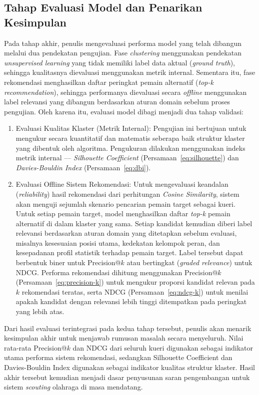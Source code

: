 \subsection{Tahap Evaluasi Model dan Penarikan Kesimpulan}
\label{subsec:evaluasi}

Pada tahap akhir, penulis mengevaluasi performa model yang telah dibangun melalui dua pendekatan pengujian. Fase \emph{clustering} menggunakan pendekatan \emph{unsupervised learning} yang tidak memiliki label data aktual (\emph{ground truth}), sehingga kualitasnya dievaluasi menggunakan metrik internal. Sementara itu, fase rekomendasi menghasilkan daftar peringkat pemain alternatif (\emph{top-k recommendation}), sehingga performanya dievaluasi secara \emph{offline} menggunakan label relevansi yang dibangun berdasarkan aturan domain sebelum proses pengujian. Oleh karena itu, evaluasi model dibagi menjadi dua tahap validasi:

\begin{enumerate}
  \item Evaluasi Kualitas Klaster (Metrik Internal): Pengujian ini bertujuan untuk mengukur secara kuantitatif dan matematis seberapa baik struktur klaster yang dibentuk oleh algoritma. Pengukuran dilakukan menggunakan indeks metrik internal --- \emph{Silhouette Coefficient} (Persamaan~\eqref{eq:silhouette}) dan \emph{Davies-Bouldin Index} (Persamaan~\eqref{eq:dbi}).

  \item Evaluasi Offline Sistem Rekomendasi: Untuk mengevaluasi keandalan (\emph{reliability}) hasil rekomendasi dari perhitungan \emph{Cosine Similarity}, sistem akan menguji sejumlah skenario pencarian pemain target sebagai kueri. Untuk setiap pemain target, model menghasilkan daftar \emph{top-k} pemain alternatif di dalam klaster yang sama. Setiap kandidat kemudian diberi label relevansi berdasarkan aturan domain yang ditetapkan sebelum evaluasi, misalnya kesesuaian posisi utama, kedekatan kelompok peran, dan kesepadanan profil statistik terhadap pemain target. Label tersebut dapat berbentuk biner untuk Precision@$k$ atau bertingkat (\emph{graded relevance}) untuk NDCG. Performa rekomendasi dihitung menggunakan Precision@$k$ (Persamaan~\eqref{eq:precision-k}) untuk mengukur proporsi kandidat relevan pada $k$ rekomendasi teratas, serta NDCG (Persamaan~\eqref{eq:ndcg-k}) untuk menilai apakah kandidat dengan relevansi lebih tinggi ditempatkan pada peringkat yang lebih atas.
\end{enumerate}

Dari hasil evaluasi terintegrasi pada kedua tahap tersebut, penulis akan menarik kesimpulan akhir untuk menjawab rumusan masalah secara menyeluruh. Nilai rata-rata Precision@$k$ dan NDCG dari seluruh kueri digunakan sebagai indikator utama performa sistem rekomendasi, sedangkan Silhouette Coefficient dan Davies-Bouldin Index digunakan sebagai indikator kualitas struktur klaster. Hasil akhir tersebut kemudian menjadi dasar penyusunan saran pengembangan untuk sistem \emph{scouting} olahraga di masa mendatang.

